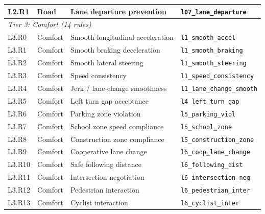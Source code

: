\begin{table}[h]
\begin{tabular}{llp{4.5cm}p{3.5cm}}
L2.R1 & Road & Lane departure prevention & \texttt{\footnotesize l07\_lane\_departure} \\
\midrule
\multicolumn{4}{l}{\textit{Tier 3: Comfort (14 rules)}} \\
L3.R0 & Comfort & Smooth longitudinal acceleration & \texttt{\footnotesize l1\_smooth\_accel} \\
L3.R1 & Comfort & Smooth braking deceleration & \texttt{\footnotesize l1\_smooth\_braking} \\
L3.R2 & Comfort & Smooth lateral steering & \texttt{\footnotesize l1\_smooth\_steering} \\
L3.R3 & Comfort & Speed consistency & \texttt{\footnotesize l1\_speed\_consistency} \\
L3.R4 & Comfort & Jerk / lane-change smoothness & \texttt{\footnotesize l1\_lane\_change\_smooth} \\
L3.R5 & Comfort & Left turn gap acceptance & \texttt{\footnotesize l4\_left\_turn\_gap} \\
L3.R6 & Comfort & Parking zone violation & \texttt{\footnotesize l5\_parking\_viol} \\
L3.R7 & Comfort & School zone speed compliance & \texttt{\footnotesize l5\_school\_zone} \\
L3.R8 & Comfort & Construction zone compliance & \texttt{\footnotesize l5\_construction\_zone} \\
L3.R9 & Comfort & Cooperative lane change & \texttt{\footnotesize l6\_coop\_lane\_change} \\
L3.R10 & Comfort & Safe following distance & \texttt{\footnotesize l6\_following\_dist} \\
L3.R11 & Comfort & Intersection negotiation & \texttt{\footnotesize l6\_intersection\_neg} \\
L3.R12 & Comfort & Pedestrian interaction & \texttt{\footnotesize l6\_pedestrian\_inter} \\
L3.R13 & Comfort & Cyclist interaction & \texttt{\footnotesize l6\_cyclist\_inter} \\
\bottomrule
\end{tabular}
\vspace{1mm}

\end{table}

